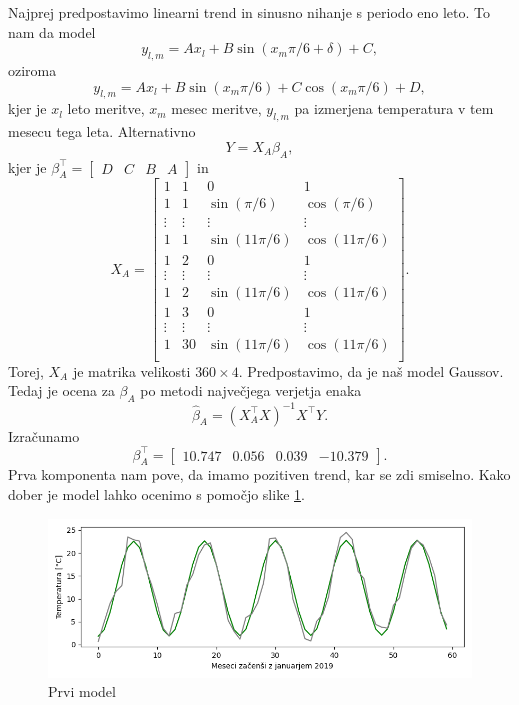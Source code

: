 \documentclass[12pt, a4paper]{article}
\begin{document}
Najprej predpostavimo linearni trend in sinusno nihanje s periodo eno leto. 
To nam da model
\[
    y_{l,m} = Ax_l + B\sin(x_m\pi/6 + \delta) + C,
\]
oziroma
\[
    y_{l,m} = Ax_l + B\sin(x_m\pi/6) + C\cos(x_m\pi/6) + D,
\]
kjer je $x_l$ leto meritve, $x_m$ mesec meritve, $y_{l,m}$ pa 
izmerjena temperatura v tem mesecu tega leta. Alternativno
\[
    Y = X_A\beta_A,
\]
kjer je $\beta_A^\top = \begin{bmatrix}
    D & C & B & A
\end{bmatrix}$ in
\[
    X_A = \begin{bmatrix}
        1 & 1 & 0 & 1 \\
        1 & 1 & \sin\left(\pi/6\right) & \cos\left(\pi/6\right) \\
        \vdots & \vdots & \vdots & \vdots \\
        1 & 1 &  \sin\left(11\pi/6\right) & \cos\left(11\pi/6\right) \\
        1 & 2 & 0 & 1 \\
        \vdots & \vdots & \vdots & \vdots \\
        1 & 2 &  \sin\left(11\pi/6\right) & \cos\left(11\pi/6\right) \\
        1 & 3 &  0 & 1 \\
        \vdots & \vdots & \vdots & \vdots \\
        1 & 30 & \sin\left(11\pi/6\right) & \cos\left(11\pi/6\right)\\
        \end{bmatrix}.
\]
Torej, $X_A$ je matrika velikosti $360 \times 4$. Predpostavimo, da je 
naš model Gaussov. Tedaj je ocena za $\beta_A$ po metodi največjega 
verjetja enaka
\[
    \hat \beta_A = (X_A^\top X)^{-1} X^\top Y.
\]
Izračunamo
\[
    \beta_A^\top = \begin{bmatrix}
        10.747 & 0.056 & 0.039 & -10.379
    \end{bmatrix}.
\]
Prva komponenta nam pove, da imamo pozitiven trend, kar se zdi 
smiselno. Kako dober je model lahko ocenimo s pomočjo slike 
\ref{png:prvi}.
\begin{figure}[H]
    \centering
    \includegraphics[width=14cm]{Slike/prvi_model.png}
    \caption{Prvi model}
    \label{png:prvi}
\end{figure}
\end{document}
